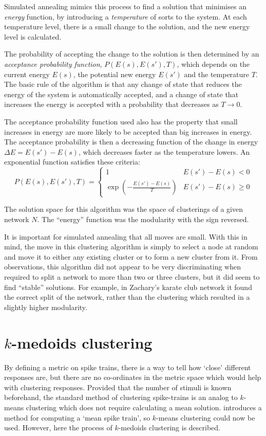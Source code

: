 Simulated annealing mimics this process to find a solution that minimises an \emph{energy} function, by introducing a \emph{temperature} of sorts to the system. At each temperature level, there is a small change to the solution, and the new energy level is calculated.

The probability of accepting the change to the solution is then determined by an \emph{acceptance probability function}, $P(E(s),E(s'),T)$, which depends on the current energy $E(s)$, the potential new energy $E(s')$ and the temperature $T$.  The basic rule of the algorithm is that any change of state that reduces the energy of the system is automatically accepted, and a change of state that increases the energy is accepted with a probability that decreases as $T\rightarrow0$.

The acceptance probability function used also has the property that small increases in energy are more likely to be accepted than big increases in energy.  The acceptance probability is then a decreasing function of the change in energy $\Delta E = E(s')-E(s)$, which decreases faster as the temperature lowers.  An exponential function satisfies these criteria:
\begin{equation}
P(E(s),E(s'),T) = \left\{ \begin{array}{ll} 1 & E(s')-E(s)<0 \\ \exp\left(-\frac{E(s')-E(s)}{T}\right) & E(s') - E(s)\geq 0 \end{array} \right.
\end{equation}

The solution space for this algorithm was the space of clusterings of a given network $N$.  The ``energy'' function was the modularity with the sign reversed.

It is important for simulated annealing that all moves are small.  With this in mind, the move in this clustering algorithm is simply to select a node at random and move it to either any existing cluster or to form a new cluster from it.  From observations, this algorithm did not appear to be very discriminating when required to split a network to more than two or three clusters, but it did seem to find ``stable'' solutions. For example, in Zachary's karate club network \citep{Zachary1977a} it found the correct split of the network, rather than the clustering which resulted in a slightly higher modularity. 

\section{$k$-medoids clustering}
By defining a metric on spike trains, there is a way to tell how \lq{}close\rq{} different responses are, but there are no co-ordinates in the metric space which 
would help with clustering responses.  Provided that the number of stimuli is known beforehand, the standard method of clustering 
spike-trains is an analog to $k$-means clustering which does not require calculating a mean solution. \citep{JulienneHoughton2012a} introduces a method for computing a \lq{}mean spike train\rq{}, so $k$-means clustering could now be used.  However, here the process of $k$-medoids clustering is described.

